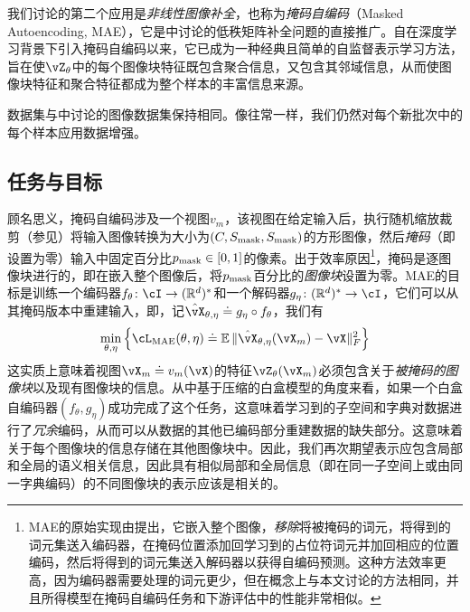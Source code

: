 \documentclass[../../book-main_zh.tex]{subfiles}
\begin{document}
我们讨论的第二个应用是\textit{非线性图像补全}，也称为\textit{掩码自编码}（Masked Autoencoding, MAE），它是中讨论的低秩矩阵补全问题的直接推广。自\cite{he2022masked}在深度学习背景下引入掩码自编码以来，它已成为一种经典且简单的自监督表示学习方法，旨在使\(\vZ_{\theta}\)中的每个图像块特征既包含聚合信息，又包含其邻域信息，从而使图像块特征和聚合特征都成为整个样本的丰富信息来源。

数据集与中讨论的图像数据集保持相同。像往常一样，我们仍然对每个新批次中的每个样本应用数据增强。

\subsection{任务与目标}\label{sub:image_completion_objective}

顾名思义，掩码自编码涉及一个视图\(v_{m}\)，该视图在给定输入后，执行随机缩放裁剪（参见）将输入图像转换为大小为\((C, S_{\mathrm{mask}}, S_{\mathrm{mask}})\)的方形图像，然后\textit{掩码}（即设置为零）输入中固定百分比\(p_{\mathrm{mask}} \in [0, 1]\)的像素。出于效率原因\footnote{MAE的原始实现由\cite{he2022masked}提出，它嵌入整个图像，\textit{移除}将被掩码的词元，将得到的词元集送入编码器，在掩码位置添加回学习到的占位符词元并加回相应的位置编码，然后将得到的词元集送入解码器以获得自编码预测。这种方法效率更高，因为编码器需要处理的词元更少，但在概念上与本文讨论的方法相同，并且所得模型在掩码自编码任务和下游评估中的性能非常相似。}，掩码是逐图像块进行的，即在嵌入整个图像后，将\(p_{\mathrm{mask}}\)百分比的\textit{图像块}设置为零。MAE的目标是训练一个编码器\(f_{\theta} \colon \cI \to (\R^{d})^{*}\)和一个解码器\(g_{\eta} \colon (\R^{d})^{*} \to \cI\)，它们可以从其掩码版本中重建输入，即，记\(\hat{\vX}_{\theta, \eta} \doteq g_{\eta} \circ f_{\theta}\)，我们有
\begin{equation}
    \min_{\theta, \eta}\bc{\cL_{\mathrm{MAE}}(\theta, \eta) \doteq \Ex\norm{\hat{\vX}_{\theta, \eta}(\vX_{m}) - \vX}_{F}^{2}}
\end{equation}
这实质上意味着视图\(\vX_{m} \doteq v_{m}(\vX)\)的特征\(\vZ_{\theta}(\vX_{m})\)必须包含关于\textit{被掩码的图像块}以及现有图像块的信息。从中基于压缩的白盒模型的角度来看，如果一个白盒自编码器\((f_{\theta}, g_{\eta})\)成功完成了这个任务，这意味着学习到的子空间和字典对数据进行了\textit{冗余}编码，从而可以从数据的其他已编码部分重建数据的缺失部分。这意味着关于每个图像块的信息存储在其他图像块中。因此，我们再次期望表示应包含局部和全局的语义相关信息，因此具有相似局部和全局信息（即在同一子空间上或由同一字典编码）的不同图像块的表示应该是相关的。
\end{document}
